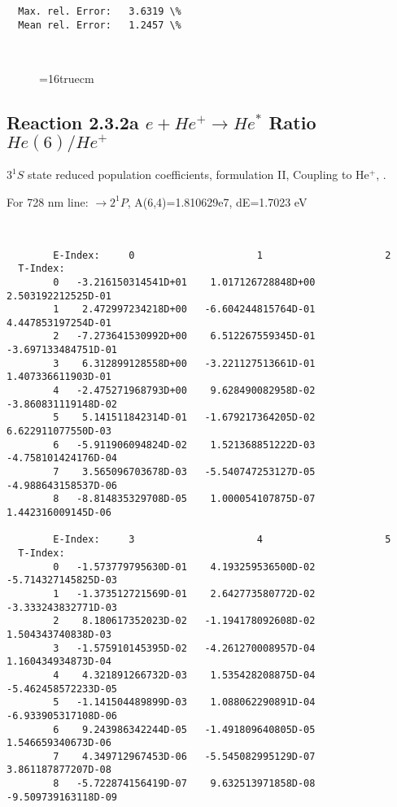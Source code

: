 \documentclass[12pt,dvipdfmx]{article}
\begin{document}
{\begin{small}
\begin{verbatim}
  Max. rel. Error:   3.6319 \%
  Mean rel. Error:   1.2457 \%



\end{verbatim}\end{small}
\begin{figure} \label{2.2e}
\epsfxsize=16truecm
\end{figure}
\newpage


\subsection{
  Reaction 2.3.2a $e + He^+ \rightarrow He^*  $ Ratio $He(6)/He^+$
}

  $3^1S$ state
  reduced population coefficients, formulation II,
  Coupling to He$^+$, \cite{kn:Fujimoto}.

  For 728 nm line:  $\rightarrow 2^1P$, A(6,4)=1.810629e7, dE=1.7023 eV

\begin{small}\begin{verbatim}


        E-Index:     0                     1                     2
  T-Index:
        0   -3.216150314541D+01    1.017126728848D+00    2.503192212525D-01
        1    2.472997234218D+00   -6.604244815764D-01    4.447853197254D-01
        2   -7.273641530992D+00    6.512267559345D-01   -3.697133484751D-01
        3    6.312899128558D+00   -3.221127513661D-01    1.407336611903D-01
        4   -2.475271968793D+00    9.628490082958D-02   -3.860831119148D-02
        5    5.141511842314D-01   -1.679217364205D-02    6.622911077550D-03
        6   -5.911906094824D-02    1.521368851222D-03   -4.758101424176D-04
        7    3.565096703678D-03   -5.540747253127D-05   -4.988643158537D-06
        8   -8.814835329708D-05    1.000054107875D-07    1.442316009145D-06

        E-Index:     3                     4                     5
  T-Index:
        0   -1.573779795630D-01    4.193259536500D-02   -5.714327145825D-03
        1   -1.373512721569D-01    2.642773580772D-02   -3.333243832771D-03
        2    8.180617352023D-02   -1.194178092608D-02    1.504343740838D-03
        3   -1.575910145395D-02   -4.261270008957D-04    1.160434934873D-04
        4    4.321891266732D-03    1.535428208875D-04   -5.462458572233D-05
        5   -1.141504489899D-03    1.088062290891D-04   -6.933905317108D-06
        6    9.243986342244D-05   -1.491809640805D-05    1.546659340673D-06
        7    4.349712967453D-06   -5.545082995129D-07    3.861187877207D-08
        8   -5.722874156419D-07    9.632513971858D-08   -9.509739163118D-09


\end{verbatim}
\end{small}}
\end{document}
